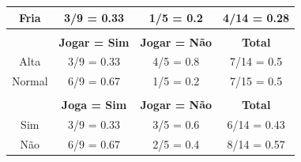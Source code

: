 \documentclass{article}
\begin{document}
\begin{table}[H]
\begin{tabular}{cccc}
      \multicolumn{1}{|c|}{Fria}                                         & \multicolumn{1}{c|}{3/9 = 0.33}                                   & \multicolumn{1}{c|}{1/5 = 0.2}                                    & \multicolumn{1}{c|}{4/14 = 0.28}                            \\ \hline
      \multicolumn{1}{l}{}                                               & \multicolumn{1}{l}{}                                              & \multicolumn{1}{l}{}                                              & \multicolumn{1}{l}{}                                        \\ \hline
      \rowcolor[HTML]{EFEFEF} 
      \multicolumn{1}{|c|}{\cellcolor[HTML]{EFEFEF}\textbf{Umidade}}    & \multicolumn{1}{c|}{\cellcolor[HTML]{EFEFEF}\textbf{Jogar = Sim}} & \multicolumn{1}{c|}{\cellcolor[HTML]{EFEFEF}\textbf{Jogar = Não}} & \multicolumn{1}{c|}{\cellcolor[HTML]{EFEFEF}\textbf{Total}} \\ \hline
      \multicolumn{1}{|c|}{Alta}                                         & \multicolumn{1}{c|}{3/9 = 0.33}                                   & \multicolumn{1}{c|}{4/5 = 0.8}                                    & \multicolumn{1}{c|}{7/14 = 0.5}                             \\ \hline
      \multicolumn{1}{|c|}{Normal}                                       & \multicolumn{1}{c|}{6/9 = 0.67}                                   & \multicolumn{1}{c|}{1/5 = 0.2}                                    & \multicolumn{1}{c|}{7/15 = 0.5}                             \\ \hline
      \multicolumn{1}{l}{}                                               & \multicolumn{1}{l}{}                                              & \multicolumn{1}{l}{}                                              & \multicolumn{1}{l}{}                                        \\ \hline
      \rowcolor[HTML]{EFEFEF} 
      \multicolumn{1}{|c|}{\cellcolor[HTML]{EFEFEF}\textbf{Vento}}       & \multicolumn{1}{c|}{\cellcolor[HTML]{EFEFEF}\textbf{Joga = Sim}}  & \multicolumn{1}{c|}{\cellcolor[HTML]{EFEFEF}\textbf{Jogar = Não}} & \multicolumn{1}{c|}{\cellcolor[HTML]{EFEFEF}\textbf{Total}} \\ \hline
      \multicolumn{1}{|c|}{Sim}                                          & \multicolumn{1}{c|}{3/9 = 0.33}                                   & \multicolumn{1}{c|}{3/5 = 0.6}                                    & \multicolumn{1}{c|}{6/14 = 0.43}                            \\ \hline
      \multicolumn{1}{|c|}{Não}                                          & \multicolumn{1}{c|}{6/9 = 0.67}                                   & \multicolumn{1}{c|}{2/5 = 0.4}                                    & \multicolumn{1}{c|}{8/14 = 0.57}                            \\ \hline
    \end{tabular}
  \end{table}
\end{document}
